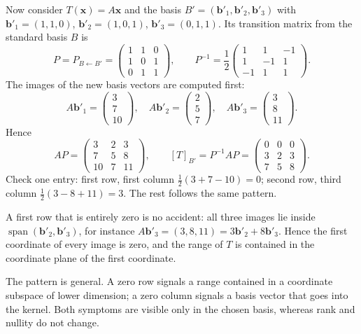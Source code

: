 Now consider $T(\mathbf{x})=A\mathbf{x}$ and the basis
$B'=(\mathbf{b}'_{1},\mathbf{b}'_{2},\mathbf{b}'_{3})$ with
$\mathbf{b}'_{1}=(1,1,0)$, $\mathbf{b}'_{2}=(1,0,1)$, $\mathbf{b}'_{3}=(0,1,1)$. Its
transition matrix from the standard basis $B$ is
\[
  P=P_{B\leftarrow B'}=\begin{pmatrix}1&1&0\\ 1&0&1\\ 0&1&1\end{pmatrix},
  \qquad
  P^{-1}=\frac{1}{2}\begin{pmatrix}1&1&-1\\ 1&-1&1\\ -1&1&1\end{pmatrix}.
\]
The images of the new basis vectors are computed first:
\[
  A\mathbf{b}'_{1}=\begin{pmatrix}3\\7\\10\end{pmatrix},\quad
  A\mathbf{b}'_{2}=\begin{pmatrix}2\\5\\7\end{pmatrix},\quad
  A\mathbf{b}'_{3}=\begin{pmatrix}3\\8\\11\end{pmatrix}.
\]
Hence
\[
  AP=\begin{pmatrix}3&2&3\\ 7&5&8\\ 10&7&11\end{pmatrix},
  \qquad
  [T]_{B'}=P^{-1}AP=\begin{pmatrix}0&0&0\\ 3&2&3\\ 7&5&8\end{pmatrix}.
\]
Check one entry: first row, first column $\tfrac{1}{2}(3+7-10)=0$; second row,
third column $\tfrac{1}{2}(3-8+11)=3$. The rest follows the same pattern.

A first row that is entirely zero is no accident: all three images lie inside
$\operatorname{span}(\mathbf{b}'_{2},\mathbf{b}'_{3})$, for instance
$A\mathbf{b}'_{3}=(3,8,11)=3\mathbf{b}'_{2}+8\mathbf{b}'_{3}$. Hence the first coordinate of
every image is zero, and the range of $T$ is contained in the coordinate plane of the first
coordinate.

The pattern is general. A zero row signals a range contained in a coordinate subspace
of lower dimension; a zero column signals a basis vector that goes into the kernel. Both symptoms
are visible only in the chosen basis, whereas rank and nullity do not change.

